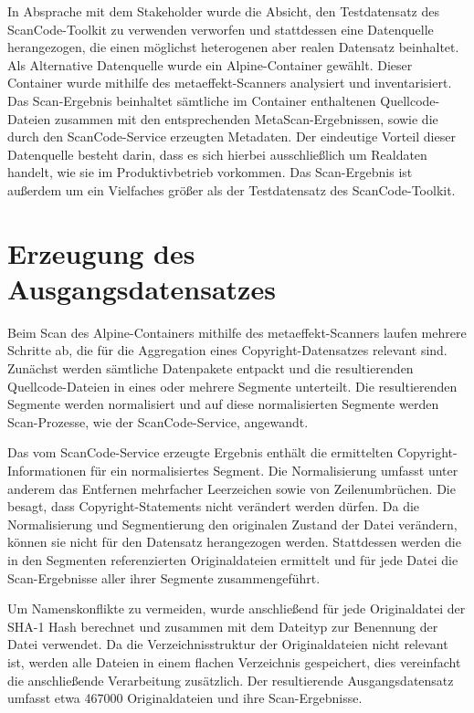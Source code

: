 In Absprache mit dem Stakeholder wurde die Absicht, den Testdatensatz des ScanCode-Toolkit zu verwenden verworfen und stattdessen eine Datenquelle herangezogen, die einen möglichst heterogenen aber realen Datensatz beinhaltet.
Als Alternative Datenquelle wurde ein Alpine-Container gewählt.
Dieser Container wurde mithilfe des metaeffekt-Scanners analysiert und inventarisiert.
Das Scan-Ergebnis beinhaltet sämtliche im Container enthaltenen Quellcode-Dateien zusammen mit den entsprechenden MetaScan-Ergebnissen, sowie die durch den ScanCode-Service erzeugten Metadaten.
Der eindeutige Vorteil dieser Datenquelle besteht darin, dass es sich hierbei ausschließlich um Realdaten handelt, wie sie im Produktivbetrieb vorkommen.
Das Scan-Ergebnis ist außerdem um ein Vielfaches größer als der Testdatensatz des ScanCode-Toolkit.


\section{Erzeugung des Ausgangsdatensatzes}\label{sec:erzeugung-datensatz}

Beim Scan des Alpine-Containers mithilfe des metaeffekt-Scanners laufen mehrere Schritte ab, die für die Aggregation eines Copyright-Datensatzes relevant sind.
Zunächst werden sämtliche Datenpakete entpackt und die resultierenden Quellcode-Dateien in eines oder mehrere Segmente unterteilt.
Die resultierenden Segmente werden normalisiert und auf diese normalisierten Segmente werden Scan-Prozesse, wie der ScanCode-Service, angewandt.

Das vom ScanCode-Service erzeugte Ergebnis enthält die ermittelten Copyright-Informationen für ein normalisiertes Segment.
Die Normalisierung umfasst unter anderem das Entfernen mehrfacher Leerzeichen sowie von Zeilenumbrüchen.
Die  besagt, dass Copyright-Statements nicht verändert werden dürfen.
Da die Normalisierung und Segmentierung den originalen Zustand der Datei verändern, können sie nicht für den Datensatz herangezogen werden.
Stattdessen werden die in den Segmenten referenzierten Originaldateien ermittelt und für jede Datei die Scan-Ergebnisse aller ihrer Segmente zusammengeführt.

Um Namenskonflikte zu vermeiden, wurde anschließend für jede Originaldatei der SHA-1 Hash berechnet und zusammen mit dem Dateityp zur Benennung der Datei verwendet.
Da die Verzeichnisstruktur der Originaldateien nicht relevant ist, werden alle Dateien in einem flachen Verzeichnis gespeichert, dies vereinfacht die anschließende Verarbeitung zusätzlich.
Der resultierende Ausgangsdatensatz umfasst etwa \num{467000} Originaldateien und ihre Scan-Ergebnisse.

